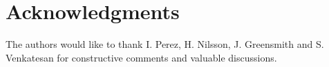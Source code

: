 \section*{Acknowledgments}
The authors would like to thank I. Perez, H. Nilsson, J. Greensmith and S. Venkatesan for constructive comments and valuable discussions.